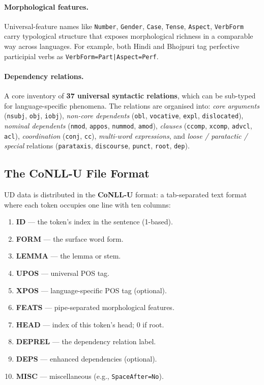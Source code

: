 \documentclass[12pt,a4paper,oneside]{report}
\begin{document}
\paragraph{Morphological features.}
Universal-feature names like \texttt{Number}, \texttt{Gender}, \texttt{Case},
\texttt{Tense}, \texttt{Aspect}, \texttt{VerbForm} carry typological structure
that exposes morphological richness in a comparable way across languages. For
example, both Hindi and Bhojpuri tag perfective participial verbs as
\texttt{VerbForm=Part|Aspect=Perf}.

\paragraph{Dependency relations.}
A core inventory of \textbf{37 universal syntactic relations}, which can be
sub-typed for language-specific phenomena. The relations are organised into:
\textit{core arguments} (\texttt{nsubj}, \texttt{obj}, \texttt{iobj}),
\textit{non-core dependents} (\texttt{obl}, \texttt{vocative},
\texttt{expl}, \texttt{dislocated}), \textit{nominal dependents}
(\texttt{nmod}, \texttt{appos}, \texttt{nummod}, \texttt{amod}),
\textit{clauses} (\texttt{ccomp}, \texttt{xcomp}, \texttt{advcl},
\texttt{acl}), \textit{coordination} (\texttt{conj}, \texttt{cc}),
\textit{multi-word expressions}, and \textit{loose / paratactic / special}
relations (\texttt{parataxis}, \texttt{discourse}, \texttt{punct},
\texttt{root}, \texttt{dep}).

\subsection{The CoNLL-U File Format}

UD data is distributed in the \textbf{CoNLL-U} format: a tab-separated text
format where each token occupies one line with ten columns:

\begin{enumerate}
  \item \textbf{ID} --- the token's index in the sentence (1-based).
  \item \textbf{FORM} --- the surface word form.
  \item \textbf{LEMMA} --- the lemma or stem.
  \item \textbf{UPOS} --- universal POS tag.
  \item \textbf{XPOS} --- language-specific POS tag (optional).
  \item \textbf{FEATS} --- pipe-separated morphological features.
  \item \textbf{HEAD} --- index of this token's head; 0 if root.
  \item \textbf{DEPREL} --- the dependency relation label.
  \item \textbf{DEPS} --- enhanced dependencies (optional).
  \item \textbf{MISC} --- miscellaneous (e.g., \texttt{SpaceAfter=No}).
\end{enumerate}
\end{document}
